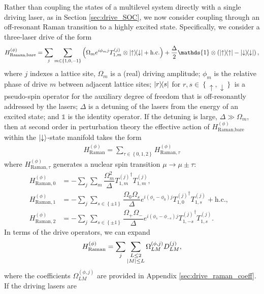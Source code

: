\documentclass[nofootinbib,notitlepage,11pt]{revtex4-2}
\renewcommand{\t}{\text} %
\newcommand{\f}[2]{\dfrac{#1}{#2}} %
\newcommand{\p}[1]{\left(#1\right)} %
\renewcommand{\set}[1]{\left\{#1\right\}} %
\newcommand{\1}{\mathds{1}}
\newcommand{\up}{\uparrow}
\newcommand{\dn}{\downarrow}
\begin{document}
Rather than coupling the states of a multilevel system directly with a
single driving laser, as in Section \ref{sec:drive_SOC}, we now
consider coupling through an off-resonant Raman transition to a highly
excited state.  Specifically, we consider a three-laser drive of the
form
\begin{align}
  H_{\t{Raman,bare}}^{(\phi)}
  = \sum_j \sum_{m\in\set{1,0,-1}} \p{\Omega_m e^{i\phi_m j}
    T_{1,m}^{(j)} \otimes \op{\up}{\dn} + \t{h.c.}}
  + \f{\Delta}{2} \1 \otimes \p{\op{\up} - \op{\dn}},
  \label{eq:raman_bare}
\end{align}
where $j$ indexes a lattice site, $\Omega_m$ is a (real) driving
amplitude; $\phi_m$ is the relative phase of drive $m$ between
adjacent lattice sites; $\op{r}{s}$ for $r,s\in\set{\up,\dn}$ is a
pseudo-spin operator for the auxiliary degree of freedom that is
off-resonantly addressed by the lasers; $\Delta$ is a detuning of the
lasers from the energy of an excited state; and $\1$ is the identity
operator.  If the detuning is large, $\Delta\gg\Omega_m$, then at
second order in perturbation theory the effective action of
$H_{\t{Raman,bare}}^{(\phi)}$ within the $\ket{\dn}$-state manifold
takes the form
\begin{align}
  H_{\t{Raman}}^{(\phi)}
  = \sum_{\tau\in\set{0,1,2}} H_{\t{Raman},\tau}^{(\phi)}
\end{align}
where $H_{\t{Raman},\tau}^{(\phi)}$ generates a nuclear spin
transition $\mu\to\mu\pm\tau$:
\begin{align}
  H_{\t{Raman},0}^{(\phi)}
  &= -\sum_j\sum_m \f{\Omega_m^2}{\Delta}
  {T_{1,m}^{(j)}}^\dag T_{1,m}^{(j)}, & \label{eq:raman_0} \\
  H_{\t{Raman},1}^{(\phi)}
  &= -\sum_j\sum_{s\in\set{\pm1}}
  \f{\Omega_0\Omega_s}{\Delta} e^{i\p{\phi_s-\phi_0} j}
  {T_{1,0}^{(j)}}^\dag T_{1,s}^{(j)} + \t{h.c.},
  \\
  H_{\t{Raman},2}^{(\phi)}
  &= -\sum_j\sum_{s\in\set{\pm1}}
  \f{\Omega_+\Omega_-}{\Delta} e^{i\p{\phi_s-\phi_{-s}}j}
  {T_{1,-s}^{(j)}}^\dag T_{1,s}^{(j)}.
  \label{eq:raman_2}
\end{align}
In terms of the drive operators, we can expand
\begin{align}
  H_{\t{Raman}}^{(\phi)}
  = \sum_j \sum_{\substack{L\le2\\\abs{M}\le L}}
  \Omega_{LM}^{(\phi,j)} D_{LM}^{(j)},
  \label{eq:raman_drive}
\end{align}
where the coefficients $\Omega_{LM}^{(\phi,j)}$ are provided in
Appendix \ref{sec:drive_raman_coeff}.  If the driving lasers are
\end{document}
